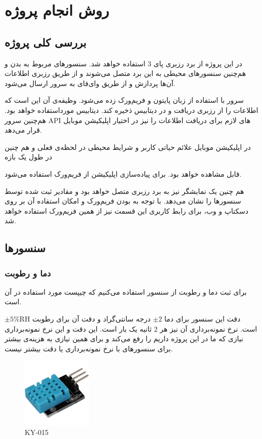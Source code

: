 \documentclass[12pt]{article}
\begin{document}
\newpage
\section{روش انجام پروژه}

\subsection{بررسی کلی پروژه}
در این پروژه از برد رزبری پای $3$ استفاده خواهد شد. سنسورهای مربوط به بدن و هم‌چنین سنسورهای محیطی به این برد متصل می‌شوند و از طریق رزبری اطلاعات آن‌ها پردازش و از طریق وای‌فای به سرور ارسال می‌شود. 

سرور با استفاده از زبان پایتون و فریم‌ورک  زده می‌شود. وظیفه‌ی آن این است که اطلاعات را از رزبری دریافت و در دیتابیس ذخیره کند. دیتابیس مورداستفاده  خواهد بود. هم‌چنین سرور API های لازم برای دریافت اطلاعات را نیز در اختیار اپلیکیشن موبایل قرار می‌دهد.

در اپلیکیشن موبایل علائم حیاتی کاربر و شرایط محیطی در لحظه‌ی فعلی و هم چنین در طول یک بازه 

قابل مشاهده خواهد بود. برای پیاده‌سازی اپلیکیشن از فریم‌ورک  استفاده می‌شود.

هم چنین یک نمایشگر نیز به برد رزبری متصل خواهد بود و مقادیر ثبت شده توسط سنسورها را نشان می‌دهد. با توجه به  بودن فریم‌ورک 
و امکان استفاده آن بر روی دسکتاپ و وب، برای رابط کاربری این قسمت نیز از همین فریم‌ورک استفاده خواهد شد.


\subsection{سنسورها}

\subsubsection{دما و رطوبت}
برای ثبت دما و رطوبت از سنسور  استفاده می‌کنیم که چیپست مورد استفاده در آن  است. 

دقت این سنسور برای دما $\pm2$ درجه سانتی‌گراد و دقت آن برای رطوبت $\pm 5\% \text{RH}$ است. نرخ نمونه‌برداری آن نیز هر $2$ ثانیه یک بار است. این دقت و این نرخ نمونه‌برداری نیازی که ما در این پروژه داریم را رفع می‌کند و برای همین نیازی به هزینه‌ی بیشتر برای سنسورهای با نرخ نمونه‌برداری یا دقت بیشتر نیست.

\begin{figure}[h]
	\begin{center}
		\includegraphics[width=0.3\textwidth]{KY-015}
	\end{center}
	\caption{KY-015}
\end{figure}
\end{document}
